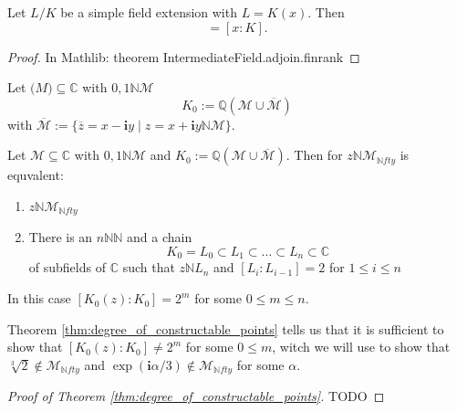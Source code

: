 \begin{theorem}
\label{thm:degree_of_simple_field_extension}
    Let $L/K$ be a simple field extension with $L = K(x)$. Then
    \begin{equation*}
        [L:K] = [x:K].
    \end{equation*}
\end{theorem}
\begin{proof}
    In Mathlib: theorem IntermediateField.adjoin.finrank
\end{proof}
\begin{definition}
    Let $\mathcal(M)\subseteq\mathbb{C}$ with $0,1 \mathbb{N} \mathcal{M}$
    \begin{equation*}
        K_0 := \mathbb{Q}(\mathcal{M}\cup \overline{\mathcal{M}})
    \end{equation*}
    with $\overline{\mathcal{M}} := \{ \overline{z} = x - \textbf{i}y \mid z = x+\textbf{i}y  \mathbb{N} \mathcal{M} \}$.
\end{definition}
\begin{theorem}
\label{thm:degree_of_constructable_points}
    Let $\mathcal{M}\subseteq\mathbb{C}$ with $0,1 \mathbb{N} \mathcal{M}$ and $K_0 := \mathbb{Q}(\mathcal{M}\cup \overline{\mathcal{M}})$.
    Then for $z \mathbb{N} \mathcal{M}_{\mathbb{N}fty}$ is equvalent:
    \begin{enumerate}
        \item $z \mathbb{N} \mathcal{M}_{\mathbb{N}fty}$
        \item There is an $n \mathbb{N} \mathbb{N}$ and a chain \begin{equation*}
            K_0 = L_0 \subset L_1 \subset \dots \subset L_n \subset \mathbb{C}
        \end{equation*}
        of subfields of $\mathbb{C}$ such that $z \mathbb{N} L_n$ and $[L_i:L_{i-1}] =2$ for $1\le i\le n$ %
    \end{enumerate}
    In this case $[K_0(z):K_0] = 2^m$ for some $0 \le m \le n$.
\end{theorem}
\begin{remark}
    Theorem \ref{thm:degree_of_constructable_points} tells us that it is sufficient to show that $[K_0(z):K_0] \ne 2^m$ for some $0 \le m $, witch we will use to show that $\sqrt[3]{2} \notin \mathcal{M}_{\mathbb{N}fty}$ and $\exp(\textbf{i} \alpha/3) \notin \mathcal{M}_{\mathbb{N}fty}$ for some $\alpha$.
\end{remark}
\begin{proof}[Proof of Theorem \ref{thm:degree_of_constructable_points}]
    TODO %
\end{proof}

